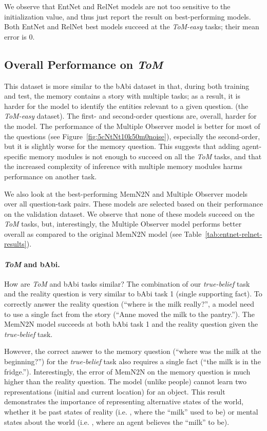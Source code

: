 We observe that EntNet and RelNet models are not too sensitive to the initialization value, and thus just report the result on best-performing models.  Both EntNet and RelNet best models succeed at the \textit{ToM-easy} tasks; their mean error is $0$. 

\subsection{Overall Performance on \textit{ToM}}

This dataset is more similar to the bAbi dataset in that, during both training and test, the memory contains a story with multiple tasks; as a result, it is harder for the model to identify the entities relevant to a given question.
 (\cf the \textit{ToM-easy} dataset). The first- and second-order questions are, overall, harder for the model. The performance of the Multiple Observer model is better for most of the questions (see
Figure~\ref{fig:5cNtNt10k50m0noise}), especially the second-order, but it is slightly worse for the memory question. This suggests that adding agent-specific memory modules is not enough to succeed on all the \textit{ToM} tasks, and that the increased complexity of inference with multiple memory modules harms performance on another task.

We also look at the best-performing MemN2N and Multiple Observer models over all question-task pairs.  These models are selected based on their performance on the validation dataset. We observe that none of these models succeed on the
\textit{ToM} tasks, but, interestingly, the Multiple Observer model performs better overall as compared to the original MemN2N model (see
Table~\ref{tab:entnet-relnet-results}).

\paragraph{\textit{ToM} and bAbi.} How are \textit{ToM} and bAbi tasks similar? The combination of our \textit{true-belief} task and the reality question is very similar to bAbi task 1 (single supporting fact). To correctly answer the reality question (``where is the milk really?'', a model need to use a single fact from the story (``Anne moved the milk to the pantry.''). The MemN2N model succeeds at both bAbi task 1 and the reality question given the \textit{true-belief} task.

However, the correct answer to the memory question (``where was the milk at the beginning?'') for the \textit{true-belief} task also requires a single fact (``the milk is in the fridge.''). Interestingly, the error of MemN2N on the memory question is much higher than the reality question. The model (unlike people) cannot learn two representations (initial and current location) for an object. This result demonstrates the importance of representing alternative states of the world, whether it be past states of reality (i.e. , where the ``milk'' used to be) or mental states about the world (i.e. , where an agent believes the ``milk'' to be).


